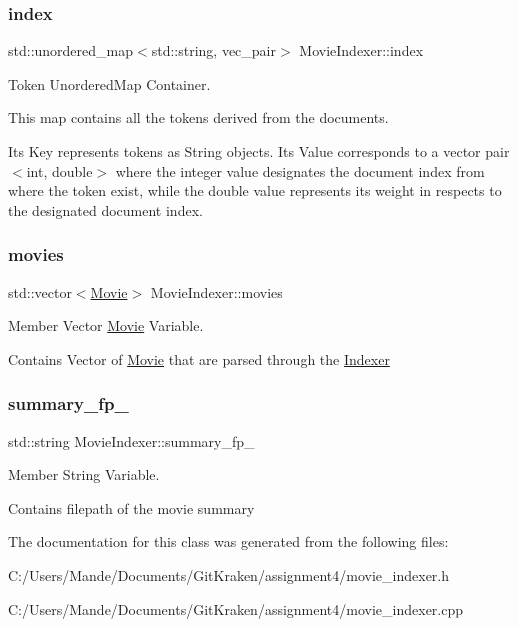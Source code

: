 \subsubsection{\texorpdfstring{index}{index}}
{\footnotesize\ttfamily std\+::unordered\+\_\+map$<$std\+::string, vec\+\_\+pair$>$ Movie\+Indexer\+::index\hspace{0.3cm}{\ttfamily [private]}}



Token Unordered\+Map Container. 

This map contains all the tokens derived from the documents.

It\textquotesingle{}s Key represents tokens as String objects. It\textquotesingle{}s Value corresponds to a vector pair $<$int, double$>$ where the integer value designates the document index from where the token exist, while the double value represents its weight in respects to the designated document index. \mbox{\label{class_movie_indexer_aabec6af7722fa0f54eb9153bef799db7}} 
\subsubsection{\texorpdfstring{movies}{movies}}
{\footnotesize\ttfamily std\+::vector$<$\hyperlink{class_movie}{Movie}$>$ Movie\+Indexer\+::movies\hspace{0.3cm}{\ttfamily [private]}}



Member Vector \hyperlink{class_movie}{Movie} Variable. 

Contains Vector of \hyperlink{class_movie}{Movie} that are parsed through the \hyperlink{class_indexer}{Indexer} \mbox{\label{class_movie_indexer_a0d98a6556c32ebe752e886f7c73ef790}} 
\subsubsection{\texorpdfstring{summary\+\_\+fp\+\_\+}{summary\_fp\_}}
{\footnotesize\ttfamily std\+::string Movie\+Indexer\+::summary\+\_\+fp\+\_\+\hspace{0.3cm}{\ttfamily [private]}}



Member String Variable. 

Contains filepath of the movie summary 

The documentation for this class was generated from the following files\+:\begin{DoxyCompactItemize}
\item 
C\+:/\+Users/\+Mande/\+Documents/\+Git\+Kraken/assignment4/movie\+\_\+indexer.\+h\item 
C\+:/\+Users/\+Mande/\+Documents/\+Git\+Kraken/assignment4/movie\+\_\+indexer.\+cpp\end{DoxyCompactItemize}
